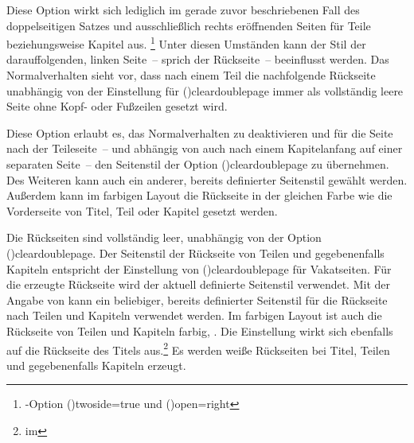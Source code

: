 \begin{DeclareEntity*}{}
\begin{DeclareEntity*}{}
\begin{DeclareEntity*}{}
\begin{Declaration}
Diese Option wirkt sich lediglich im gerade zuvor beschriebenen Fall des 
doppelseitigen Satzes und ausschließlich rechts eröffnenden Seiten für Teile 
beziehungsweise Kapitel aus.%
\footnote{%
  \KOMAScript-Option \Option(){twoside=true} und 
  \Option(){open=right}%
}
Unter diesen Umständen kann der Stil der darauffolgenden, linken Seite~-- 
sprich der Rückseite~-- beeinflusst werden. Das Normalverhalten sieht vor, dass 
nach einem Teil die nachfolgende Rückseite unabhängig von der Einstellung für 
\Option(){cleardoublepage}
immer als vollständig leere Seite ohne Kopf- oder Fußzeilen gesetzt wird.

Diese Option erlaubt es, das Normalverhalten zu deaktivieren und für die Seite 
nach der Teileseite~-- und abhängig von  auch nach einem 
Kapitelanfang auf einer separaten Seite~-- den Seitenstil der Option 
\Option(){cleardoublepage} zu übernehmen. Des 
Weiteren kann auch ein anderer, bereits definierter Seitenstil gewählt werden. 
Außerdem kann im farbigen Layout die Rückseite in der gleichen Farbe wie die 
Vorderseite von Titel, Teil oder Kapitel gesetzt werden. 
\notudscrartcl
%
\begin{DeclareValues}{}
  Die Rückseiten sind vollständig leer, unabhängig von der Option
  \Option(){cleardoublepage}.
  Der Seitenstil der Rückseite von Teilen und gegebenenfalls Kapiteln entspricht
  der Einstellung von \Option(){cleardoublepage} für 
  Vakatseiten.
  Für die erzeugte Rückseite wird der aktuell definierte Seitenstil verwendet.
  Mit der Angabe von  
  kann ein beliebiger, bereits definierter Seitenstil für die Rückseite nach 
  Teilen und Kapiteln verwendet werden.
  Im farbigen Layout ist auch die Rückseite von Teilen und Kapiteln farbig, 
  . Die Einstellung wirkt sich ebenfalls auf die 
  Rückseite des Titels aus.\footnote{%
     im \scrguide%
  }%
  Es werden weiße Rückseiten bei Titel, Teilen und gegebenenfalls Kapiteln 
  erzeugt.
\end{DeclareValues}
\end{Declaration}
%




\end{DeclareEntity*}
\end{DeclareEntity*}
\end{DeclareEntity*}
